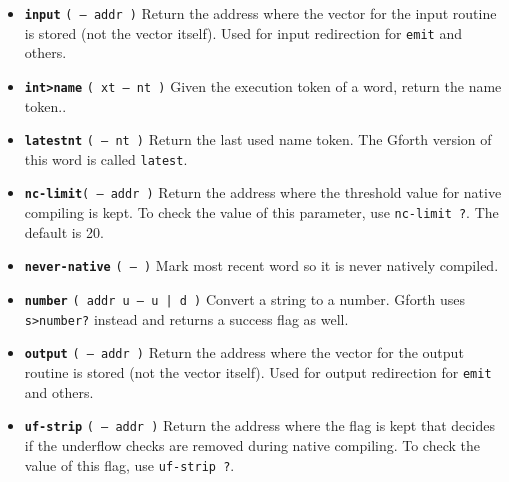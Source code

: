 \begin{itemize}
        \item \textbf{\texttt{input}} \texttt{( -- addr )} 
                Return the address where the vector for the input routine is
                stored (not the vector itself). Used for input redirection for 
                \texttt{emit} and others. 

        \item \textbf{\texttt{int>name}} \texttt{( xt -- nt )} 
                Given the execution token of a
                word, return the name token.. 
                
        \item \textbf{\texttt{latestnt}} \texttt{( -- nt )} 
                Return the last used name token. The Gforth
                version of this word is called
                \texttt{latest}.

        \item \textbf{\texttt{nc-limit}}\texttt{( -- addr )} 
                Return the address where the threshold value for native
                compiling is kept. To check the value of
                this parameter, use \texttt{nc-limit ?}. The default is 20.

        \item \textbf{\texttt{never-native}} \texttt{( -- )} 
                Mark most recent word so it is never natively compiled.

        \item \textbf{\texttt{number}} 
                \texttt{( addr u -- u | d )} Convert a string to a number.
                Gforth uses
                \texttt{s>number?} instead
                and returns a success flag as well. 

        \item \textbf{\texttt{output}} \texttt{( -- addr )} 
                Return the address where the vector for the output routine is
                stored (not the vector itself). Used for output redirection for 
                \texttt{emit} and others. 

        \item \textbf{\texttt{uf-strip}} \texttt{( -- addr )} 
                Return the address where the flag is kept that decides if
                the underflow checks are removed during native
                compiling. To check the value of this flag, use 
                \texttt{uf-strip ?}.


\end{itemize}

